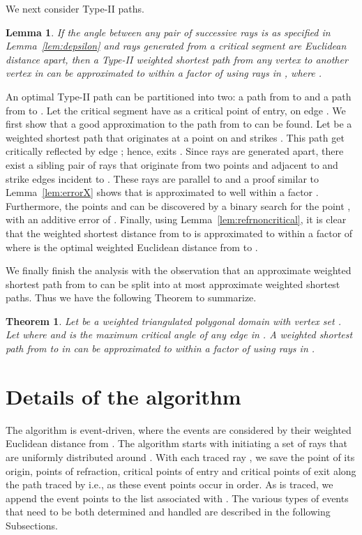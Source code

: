 \documentclass[11pt]{article}
\newtheorem{theorem}{Theorem}[section]
\newtheorem{lemma}{Lemma}[section]
\newenvironment{proof}{\par\noindent{\bf Proof:}}{\mbox{}\hfill\\}
\begin{document}
We next consider Type-II paths.
\begin{lemma}
\label{lem:refrcritical}
If the angle between any pair of successive rays is as specified in Lemma~\ref{lem:depsilon} and rays generated from a critical segment are  Euclidean distance apart, then a Type-II weighted shortest path from any vertex  to another vertex  in  can be approximated to within a factor of  using rays in , where .
\end{lemma}
\begin{proof}
An optimal Type-II path  can be partitioned into two: a path  from  to  and a path  from  to .
Let the critical segment  have as a critical point of entry,  on edge .
We first show that a good approximation to the path  from  to  can be found.
Let  be a weighted shortest path that originates at a point  on  and strikes .
This path get critically reflected by edge ; hence, exits .
Since rays are generated  apart, there exist a sibling pair of rays that originate from two
points  and  adjacent to  and strike edges incident to .
These rays are parallel to  and a proof similar to Lemma~\ref{lem:errorX} shows that 
 is approximated to well within a factor .
Furthermore, the points  and  can be discovered by a binary search for the point , with an additive error of .
Finally, using Lemma~\ref{lem:refrnoncritical}, it is clear that the weighted shortest distance from  to  is approximated to within a factor of  where  is the optimal weighted Euclidean distance from  to . 
\end{proof}

We finally finish the analysis with the observation that an approximate weighted shortest path from  to  can be split into at most  approximate weighted shortest paths.
Thus we have the following Theorem to summarize.
\begin{theorem}
Let  be a weighted triangulated polygonal domain with vertex set . Let 
where 
and  is the maximum critical angle of any edge in .
A weighted shortest path from  to  in  can be approximated to within a factor of  using rays in .
\end{theorem}

\section{Details of the algorithm}
\label{sect:algodetails}

The algorithm is event-driven, where the events are considered by their weighted Euclidean distance from .
The algorithm starts with initiating a set  of rays that are uniformly distributed around .
With each traced ray , we save the point of its origin, points of refraction, critical points of entry and critical points of exit along the path traced by   i.e., as these event points occur in order.
As  is traced, we append the event points to the list associated with .
The various types of events that need to be both determined and handled are described in the following Subsections.
\end{document}
